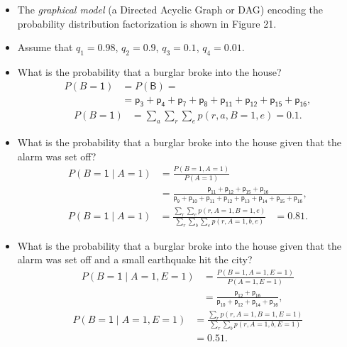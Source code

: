 \documentclass{tufte-handout}
\begin{document}
\vspace{0.5cm}

\begin{itemize}
\item The \textit{graphical model}  (a Directed Acyclic Graph or DAG) encoding the 
probability distribution factorization is shown in Figure 21.
\item Assume that  $q_1=0.98$, $q_2=0.9$, $q_3=0.1$, $q_4=0.01$.
\item What is the probability that a burglar broke into the house?
\begin{align*}
P(B=\mathsf 1) &= P(\mathsf{B}) = \\ &= \mathsf{ p_3+p_4+p_7+p_8+p_{11}+p_{12}+p_{15}+p_{16},}
\end{align*}
\begin{align*}
P(B=\mathsf 1) &= \sum_{a}\sum_{r}\sum_{e} p(r,a,B=1,e) = 0.1.
\end{align*}
\end{itemize}

\begin{itemize}
\item What is the probability that a burglar broke into the house
 given that the alarm was set off?
\begin{align*}
P(B=\mathsf 1\mid A=1) &= \frac{P(B=1,A=1 )}{P(A=1)}\\ &= \frac{\mathsf{ p_{11}+p_{12}+p_{15}+p_{16}}}{\mathsf{p_{9}+p_{10}+p_{11}+p_{12}+p_{13}+p_{14}+p_{15}+p_{16}}},
\end{align*}
\begin{align*}
P(B=\mathsf 1\mid A=1) &= \frac{\sum_{r}\sum_{e} p(r,A=1,B=1,e)}{\sum_{r}\sum_{b}\sum_{e} p(r,A=1,b,e) } &= 0.81.
\end{align*}
\end{itemize}

\begin{itemize}
\item What is the probability that a burglar broke into the house
 given that the alarm was set off and a small earthquake hit the city?
\begin{align*}
P(B=\mathsf 1\mid A=1, E=1) &= \frac{P(B=1,A=1,E=1 )}{P(A=1,E=1)}\\ &= \frac{\mathsf{p_{12} +p_{16}}}{\mathsf{p_{10}+ p_{12}+p_{14}+p_{16}}},
\end{align*}
\begin{align*}
P(B=\mathsf 1\mid A=1,E=1) &= \frac{\sum_{r}p(r,A=1,B=1,E=1)}{\sum_{r}\sum_{b} p(r,A=1,b,E=1) } \\&= 0.51.
\end{align*}
\end{itemize}
\end{document}

